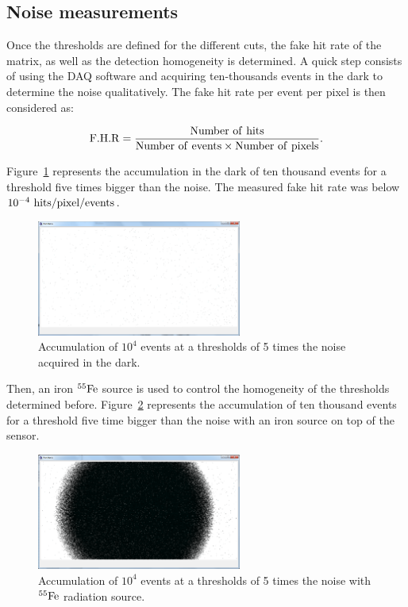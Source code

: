   \subsection{Noise measurements}

  Once the thresholds are defined for the different cuts, the fake hit rate of the matrix, as well as the detection homogeneity is determined.
  A quick step consists of using the \gls{DAQ} software and acquiring ten-thousands events in the dark to determine the noise qualitatively. 
  The fake hit rate per event per pixel is then considered as:

  \begin{equation}
    \rm{F.H.R} = \frac{\rm{Number~of~hits}}{\rm{Number~of~events} \times \rm{Number~of~pixels}}. 
  \end{equation}
  
  Figure~\ref{fig:darkEvents} represents the accumulation in the dark of ten thousand events for a threshold five times bigger than the noise.
  The measured fake hit rate was below $10^{-4}~\rm{hits/pixel/events}$.

   \begin{figure}[!h]
    \centering
    \includegraphics[width=0.6\textwidth]{Pictures/labTests/dark_10kEvents_not_noisy.png}
    \caption{Accumulation of $10^4$ events at a thresholds of 5 times the noise acquired in the dark.}
    \label{fig:darkEvents}
  \end{figure}

  Then, an iron $^{55}\rm{Fe}$ source is used to control the homogeneity of the thresholds determined before.
  Figure~\ref{fig:fe55} represents the accumulation of ten thousand events for a threshold five time bigger than the noise with an iron source on top of the sensor.
  
  \begin{figure}[!h]
    \centering
    \includegraphics[width=0.6\textwidth]{Pictures/labTests/10kEvents_Fe55_cut5sigma.png}
    \caption{Accumulation of $10^{4}$ events at a thresholds of 5 times the noise with $^{55}\rm{Fe}$ radiation source.}
    \label{fig:fe55}
  \end{figure}

